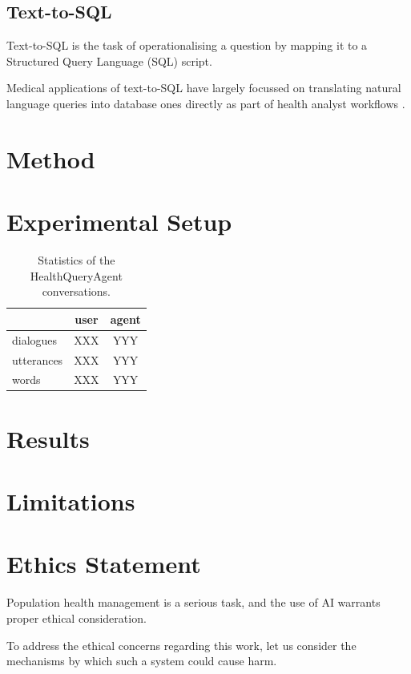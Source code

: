 \documentclass[11pt]{article}
\begin{document}
\subsection{Text-to-SQL}
Text-to-SQL is the task of operationalising a question by mapping it to a Structured Query Language (SQL) script.

Medical applications of text-to-SQL have largely focussed on translating natural language queries into database ones directly as part of health analyst workflows \citet{ziletti_retrieval_2024}.

\section{Method}

\section{Experimental Setup}

\begin{table}[t]
\centering
\begin{tabular}{|l|c|c|}
\hline
	& user & agent \\
\hline
	dialogues	& XXX & YYY \\
	utterances	& XXX & YYY \\
	words 		& XXX & YYY \\
\hline
\end{tabular}
\caption{Statistics of the HealthQueryAgent conversations.}
\label{tab:results}
\end{table}


\section{Results}

\section*{Limitations}

\section{Ethics Statement}
Population health management is a serious task, and the use of AI warrants proper ethical consideration.

To address the ethical concerns regarding this work, let us consider the mechanisms by which such a system could cause harm.
\end{document}
